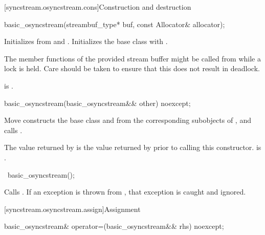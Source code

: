 [syncstream.osyncstream.cons]{Construction and destruction}

%
\begin{itemdecl}
basic_osyncstream(streambuf_type* buf, const Allocator& allocator);
\end{itemdecl}

\begin{itemdescr}
\pnum
\effects
Initializes  from  and .
Initializes the base class with .

\pnum
\begin{note}
The member functions of the provided stream buffer
might be called from  while a lock is held.
Care should be taken to ensure that this does not result in deadlock.
\end{note}

\pnum
\ensures
{} is .
\end{itemdescr}

%
\begin{itemdecl}
basic_osyncstream(basic_osyncstream&& other) noexcept;
\end{itemdecl}

\begin{itemdescr}
\pnum
\effects
Move constructs the base class
and  from the corresponding subobjects of ,
and calls .

\pnum
\ensures
The value returned by 
is the value returned by 
prior to calling this constructor.
 is .
\end{itemdescr}

%
\begin{itemdecl}
~basic_osyncstream();
\end{itemdecl}

\begin{itemdescr}
\pnum
\effects
Calls .
If an exception is thrown from ,
that exception is caught and ignored.
\end{itemdescr}

[syncstream.osyncstream.assign]{Assignment}

%
\begin{itemdecl}
basic_osyncstream& operator=(basic_osyncstream&& rhs) noexcept;
\end{itemdecl}

